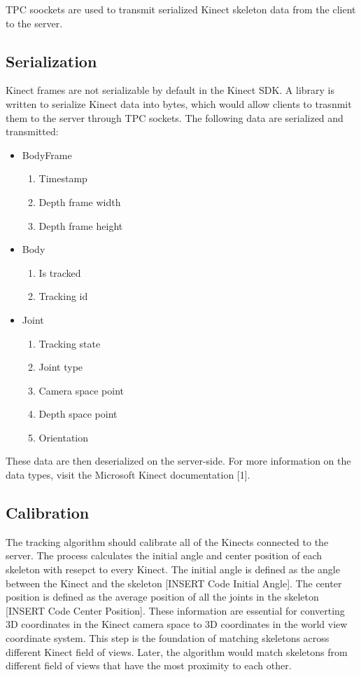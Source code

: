 \documentclass[paper=a4, fontsize=11pt]{scrartcl}
\numberwithin{equation}{section}		%
\numberwithin{figure}{section}			%
\numberwithin{table}{section}				%
\begin{document}
TPC soockets are used to transmit serialized Kinect skeleton data from the client to the server.

\subsection{Serialization}

Kinect frames are not serializable by default in the Kinect SDK. A library is written to serialize Kinect data into bytes, which would allow clients to trasnmit them to the server through TPC sockets. The following data are serialized and transmitted:

\begin{itemize}
	\item BodyFrame
		\begin{enumerate}
			\item Timestamp
			\item Depth frame width
			\item Depth frame height
		\end{enumerate}
	\item Body
		\begin{enumerate}
			\item Is tracked
			\item Tracking id
		\end{enumerate}
	\item Joint
	  	\begin{enumerate}
			\item Tracking state
			\item Joint type
			\item Camera space point
			\item Depth space point
			\item Orientation
		\end{enumerate}
\end{itemize}

These data are then deserialized on the server-side. For more information on the data types, visit the Microsoft Kinect documentation [1].

\subsection{Calibration}

The tracking algorithm should calibrate all of the Kinects connected to the server. The process calculates the initial angle and center position of each skeleton with resepct to every Kinect. The initial angle is defined as the angle between the Kinect and the skeleton [INSERT Code Initial Angle]. The center position is defined as the average position of all the joints in the skeleton [INSERT Code Center Position]. These information are essential for converting 3D coordinates in the Kinect camera space to 3D coordinates in the world view coordinate system. This step is the foundation of matching skeletons across different Kinect field of views. Later, the algorithm would match skeletons from different field of views that have the most proximity to each other.
\end{document}
